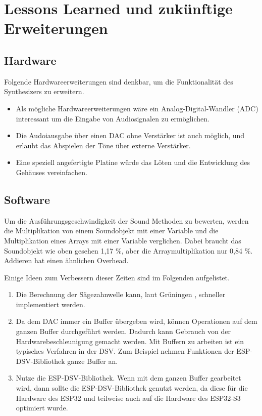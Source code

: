 \section{Lessons Learned und zukünftige Erweiterungen}

\subsection{Hardware}

Folgende Hardwareerweiterungen sind denkbar, um die Funktionalität des Synthesizers zu erweitern.

\begin{itemize}
    \item Als mögliche Hardwareerweiterungen wäre ein Analog-Digital-Wandler (ADC) 
        interessant um die Eingabe von Audiosignalen zu ermöglichen.
    \item Die Audoiausgabe über einen DAC ohne Verstärker ist auch möglich, und 
        erlaubt das Abspielen der Töne über externe Verstärker.
    \item Eine speziell angefertigte Platine würde das Löten und 
        die Entwicklung des Gehäuses vereinfachen.
\end{itemize}


\subsection{Software}

Um die Ausführungsgeschwindigkeit der Sound Methoden zu bewerten, 
werden die Multiplikation von einem Soundobjekt mit einer Variable und 
die Multiplikation eines Arrays mit einer Variable verglichen. Dabei braucht das
Soundobjekt wie oben gesehen 1,17 \%, aber die Arraymultiplikation nur 0,84 \%.
Addieren hat einen ähnlichen Overhead.

Einige Ideen zum Verbessern dieser Zeiten sind im Folgenden aufgelistet.
\begin{enumerate}
    \item Die Berechnung der Sägezahnwelle kann, laut Grüningen
    \cite[7.1.1]{grueningen2008dsv}, schneller implementiert werden.
    \item Da dem DAC immer ein Buffer übergeben wird, können Operationen auf dem ganzen
    Buffer durchgeführt werden. Dadurch kann Gebrauch von der Hardwarebeschleunigung
    gemacht werden. Mit Buffern zu arbeiten ist ein typisches Verfahren in der DSV.
    Zum Beispiel nehmen Funktionen der ESP-DSV-Bibliothek \cite{ESPDSV} ganze Buffer an.
    \item Nutze die ESP-DSV-Bibliothek. Wenn mit dem ganzen Buffer gearbeitet wird, 
    dann sollte die ESP-DSV-Bibliothek genutzt werden, da diese für die Hardware des 
    ESP32 und teilweise auch auf die Hardware des ESP32-S3 optimiert wurde.
\end{enumerate}


